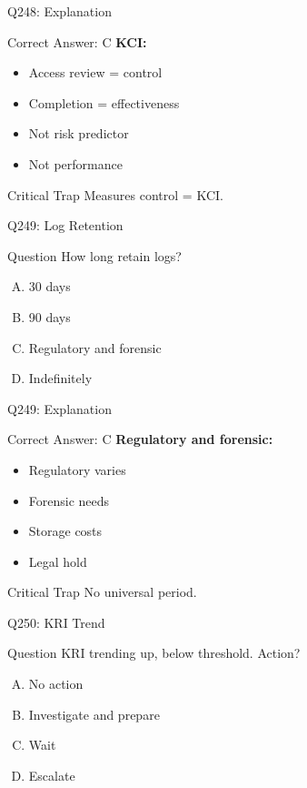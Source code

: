 \documentclass{beamer}
\begin{document}
	\begin{frame}{Q248: Explanation}
		\begin{block}{Correct Answer: C}
			\textbf{KCI:}
			\begin{itemize}
				\item Access review = control
				\item Completion = effectiveness
				\item Not risk predictor
				\item Not performance
			\end{itemize}
		\end{block}
		\begin{alertblock}{Critical Trap}
			Measures control = KCI.
		\end{alertblock}
	\end{frame}
	
	\begin{frame}{Q249: Log Retention}
		\begin{block}{Question}
			How long retain logs?
		\end{block}
		\begin{enumerate}[(A)]
			\item 30 days
			\item 90 days
			\item Regulatory and forensic
			\item Indefinitely
		\end{enumerate}
	\end{frame}
	
	\begin{frame}{Q249: Explanation}
		\begin{block}{Correct Answer: C}
			\textbf{Regulatory and forensic:}
			\begin{itemize}
				\item Regulatory varies
				\item Forensic needs
				\item Storage costs
				\item Legal hold
			\end{itemize}
		\end{block}
		\begin{alertblock}{Critical Trap}
			No universal period.
		\end{alertblock}
	\end{frame}
	
	\begin{frame}{Q250: KRI Trend}
		\begin{block}{Question}
			KRI trending up, below threshold. Action?
		\end{block}
		\begin{enumerate}[(A)]
			\item No action
			\item Investigate and prepare
			\item Wait
			\item Escalate
		\end{enumerate}
	\end{frame}
	
\end{document}
